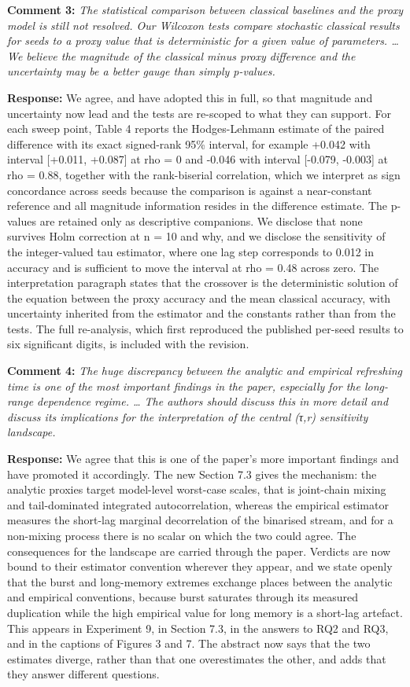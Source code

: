 \documentclass[
  11pt,
]{article}
\begin{document}
\textbf{Comment 3:} \emph{The statistical comparison between classical
baselines and the proxy model is still not resolved. Our Wilcoxon tests
compare stochastic classical results for seeds to a proxy value that is
deterministic for a given value of parameters. \ldots{} We believe the
magnitude of the classical minus proxy difference and the uncertainty
may be a better gauge than simply p-values.}

\textbf{Response:} We agree, and have adopted this in full, so that
magnitude and uncertainty now lead and the tests are re-scoped to what
they can support. For each sweep point, Table 4 reports the
Hodges-Lehmann estimate of the paired difference with its exact
signed-rank 95\% interval, for example +0.042 with interval {[}+0.011,
+0.087{]} at rho = 0 and -0.046 with interval {[}-0.079, -0.003{]} at
rho = 0.88, together with the rank-biserial correlation, which we
interpret as sign concordance across seeds because the comparison is
against a near-constant reference and all magnitude information resides
in the difference estimate. The p-values are retained only as
descriptive companions. We disclose that none survives Holm correction
at n = 10 and why, and we disclose the sensitivity of the integer-valued
tau estimator, where one lag step corresponds to 0.012 in accuracy and
is sufficient to move the interval at rho = 0.48 across zero. The
interpretation paragraph states that the crossover is the deterministic
solution of the equation between the proxy accuracy and the mean
classical accuracy, with uncertainty inherited from the estimator and
the constants rather than from the tests. The full re-analysis, which
first reproduced the published per-seed results to six significant
digits, is included with the revision.

\textbf{Comment 4:} \emph{The huge discrepancy between the analytic and
empirical refreshing time is one of the most important findings in the
paper, especially for the long-range dependence regime. \ldots{} The
authors should discuss this in more detail and discuss its implications
for the interpretation of the central (τ,r) sensitivity landscape.}

\textbf{Response:} We agree that this is one of the paper's more
important findings and have promoted it accordingly. The new Section 7.3
gives the mechanism: the analytic proxies target model-level worst-case
scales, that is joint-chain mixing and tail-dominated integrated
autocorrelation, whereas the empirical estimator measures the short-lag
marginal decorrelation of the binarised stream, and for a non-mixing
process there is no scalar on which the two could agree. The
consequences for the landscape are carried through the paper. Verdicts
are now bound to their estimator convention wherever they appear, and we
state openly that the burst and long-memory extremes exchange places
between the analytic and empirical conventions, because burst saturates
through its measured duplication while the high empirical value for long
memory is a short-lag artefact. This appears in Experiment 9, in Section
7.3, in the answers to RQ2 and RQ3, and in the captions of Figures 3 and
7. The abstract now says that the two estimates diverge, rather than
that one overestimates the other, and adds that they answer different
questions.
\end{document}
